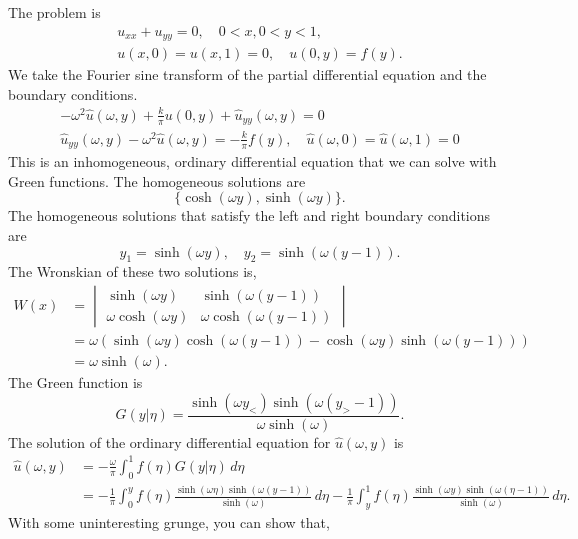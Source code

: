 {%
\begin{Solution}
  The problem is
  \begin{gather*}
    u_{x x} + u_{y y} = 0, \quad 0 < x, 0 < y < 1, \\
    u(x,0) = u(x,1) = 0, \quad u(0,y) = f(y).
  \end{gather*}
  We take the Fourier sine transform of the partial differential equation
  and the boundary conditions.
  \begin{gather*}
    -\omega^2 \hat{u}(\omega, y) + \frac{k}{\pi} u(0,y) + \hat{u}_{y y}(\omega,y)
    = 0 \\
    \hat{u}_{y y}(\omega,y) -\omega^2 \hat{u}(\omega, y) = -  \frac{k}{\pi} f(y),
    \quad \hat{u}(\omega,0) = \hat{u}(\omega,1) = 0 
  \end{gather*}
  This is an inhomogeneous, ordinary differential equation that we can solve 
  with Green functions.  The homogeneous solutions are
  \[
  \{ \cosh(\omega y), \sinh( \omega y) \}.
  \]
  The homogeneous solutions that satisfy the left and right boundary conditions
  are
  \[
  y_1 = \sinh(\omega y), \quad y_2 = \sinh(\omega(y-1)).
  \]
  The Wronskian of these two solutions is,
  \begin{align*}
    W(x)    &= \begin{vmatrix} \sinh(\omega y) & \sinh(\omega(y-1)) \\
      \omega \cosh(\omega y) & \omega \cosh(\omega(y-1)) 
    \end{vmatrix} \\
    &= \omega \left( \sinh(\omega y) \cosh(\omega(y-1))
      - \cosh(\omega y) \sinh(\omega(y-1)) \right) \\
    &= \omega \sinh(\omega ).
  \end{align*}
  The Green function is
  \[
  G(y|\eta) = \frac{ \sinh(\omega y_<) \sinh( \omega(y_> -1)) }
  { \omega \sinh( \omega ) }.
  \]
  The solution of the ordinary differential equation for $\hat{u}(\omega,y)$ is
  \begin{align*}
    \hat{u}(\omega,y)
    &= - \frac{\omega}{\pi} \int_0^1 f(\eta) G(y|\eta) \,d\eta \\
    &= - \frac{1}{\pi} \int_0^y f(\eta) 
    \frac{ \sinh(\omega \eta) \sinh(\omega(y-1)) }
    { \sinh(\omega) } \,d \eta
    - \frac{1}{\pi} \int_y^1 f(\eta) 
    \frac{ \sinh(\omega y) \sinh(\omega(\eta-1)) }
    { \sinh(\omega) } \,d \eta.
  \end{align*}
  With some uninteresting grunge, you can show that,

\end{Solution}}
